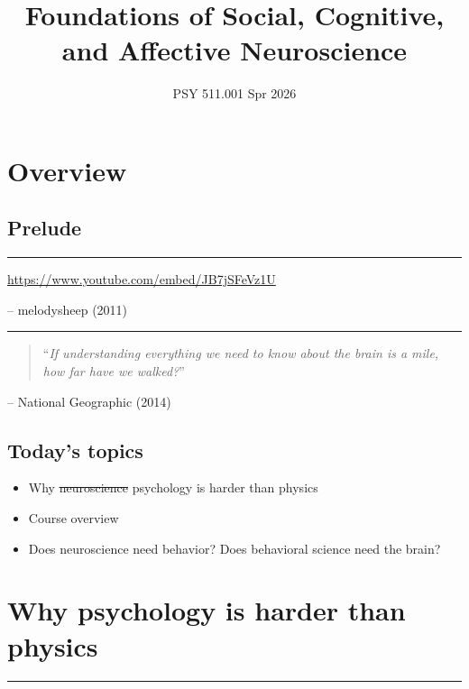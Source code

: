 \documentclass[
  letterpaper,
  DIV=11,
  numbers=noendperiod]{scrartcl}
\title{Foundations of Social, Cognitive, and Affective Neuroscience}
\subtitle{PSY 511.001 Spr 2026}
\author{}
\date{}
\providecommand{\tightlist}{%
  \setlength{\itemsep}{0pt}\setlength{\parskip}{0pt}}
\begin{document}
\maketitle


\section{Overview}\label{overview}

\subsection{Prelude}\label{prelude}

\begin{center}\rule{0.5\linewidth}{0.5pt}\end{center}

\url{https://www.youtube.com/embed/JB7jSFeVz1U}

-- melodysheep (2011)

\begin{center}\rule{0.5\linewidth}{0.5pt}\end{center}

\begin{quote}
``\emph{If understanding everything we need to know about the brain is a
mile, how far have we walked?}''
\end{quote}

-- National Geographic (2014)

\subsection{Today's topics}\label{todays-topics}

\begin{itemize}
\tightlist
\item
  Why \st{neuroscience} psychology is harder than physics
\item
  Course overview
\item
  Does neuroscience need behavior? Does behavioral science need the
  brain?
\end{itemize}

\section{Why psychology is harder than
physics}\label{why-psychology-is-harder-than-physics}

\begin{center}\rule{0.5\linewidth}{0.5pt}\end{center}
\end{document}
